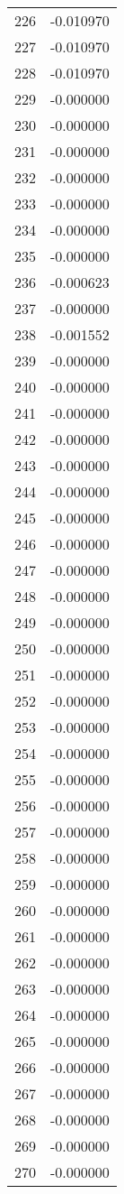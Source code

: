 \documentclass[12pt]{article}
\begin{document}
\begin{longtable}{@{}cc@{}}
226 & -0.010970 \\
227 & -0.010970 \\
228 & -0.010970 \\
229 & -0.000000 \\
230 & -0.000000 \\
231 & -0.000000 \\
232 & -0.000000 \\
233 & -0.000000 \\
234 & -0.000000 \\
235 & -0.000000 \\
236 & -0.000623 \\
237 & -0.000000 \\
238 & -0.001552 \\
239 & -0.000000 \\
240 & -0.000000 \\
241 & -0.000000 \\
242 & -0.000000 \\
243 & -0.000000 \\
244 & -0.000000 \\
245 & -0.000000 \\
246 & -0.000000 \\
247 & -0.000000 \\
248 & -0.000000 \\
249 & -0.000000 \\
250 & -0.000000 \\
251 & -0.000000 \\
252 & -0.000000 \\
253 & -0.000000 \\
254 & -0.000000 \\
255 & -0.000000 \\
256 & -0.000000 \\
257 & -0.000000 \\
258 & -0.000000 \\
259 & -0.000000 \\
260 & -0.000000 \\
261 & -0.000000 \\
262 & -0.000000 \\
263 & -0.000000 \\
264 & -0.000000 \\
265 & -0.000000 \\
266 & -0.000000 \\
267 & -0.000000 \\
268 & -0.000000 \\
269 & -0.000000 \\
270 & -0.000000 \\

\end{longtable}
\end{document}
